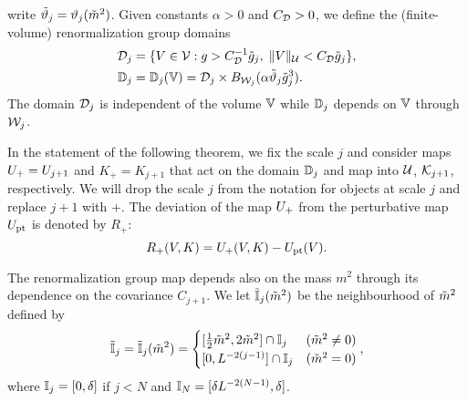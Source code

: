 
write $\tilde{\vartheta}_j = \vartheta_j(\tilde{m}^2)$.
Given constants $\alpha > 0$ and $C_{\mathcal{D}} > 0$, we define the (finite-volume)
renormalization group domains
\begin{align}
\label{e:DVdef}
\mathcal{D}_j
	&=
\{ V\in \mathcal{V} :
	g > C_{\mathcal{D}}^{-1} \tilde{g}_j, \; \|V\|_{\mathcal{U}} < C_{\mathcal{D}} \tilde{g}_j \}, \\
\label{e:domRG}
\mathbb{D}_j
	&= \mathbb{D}_j(\mathbb{V})
	= \mathcal{D}_j \times B_{\mathcal{W}_j}(\alpha \tilde{\vartheta}_j \tilde{g}_j^3).
\end{align}
The domain $\mathcal{D}_j$ is independent of the volume $\mathbb{V}$ while $\mathbb{D}_j$
depends on $\mathbb{V}$ through $\mathcal{W}_j$.

In the statement of the following theorem, we fix the scale $j$ and
consider maps $U_+ = U_{j+1}$ and $K_+ = K_{j+1}$ that act on the domain
$\mathbb{D}_j$ and map into $\mathcal{U}$, $\mathcal{K}_{j+1}$, respectively.
We will drop the scale $j$ from the notation for objects at scale $j$
and replace $j + 1$ with $+$.
The deviation of the map $U_+$ from the perturbative map $U_{\rm pt}$
is denoted by $R_+$:
\begin{equation}
\label{e:Rplusdef}
    R_+(V,K) = U_+(V,K) -U_{\rm pt}(V).
\end{equation}

The renormalization group map depends also on the mass $m^2$ through its
dependence on the covariance $C_{j+1}$.
We let $\tilde{\mathbb{I}}_j(\tilde{m}^2)$ be the neighbourhood of $\tilde{m}^2$ defined by
\begin{equation}
\lbeq{Itilint}
    \Igen_j = \Igen_j(\mgen^2) =
    \begin{cases}
    [\frac 12 \mgen^2, 2 \mgen^2] \cap \Iint_j & (\mgen^2 \neq 0)
    \\
    [0,L^{-2(j-1)}] \cap \Iint_j & (\mgen^2 =0)
    \end{cases},
\end{equation}
where $\mathbb{I}_j = [0, \delta]$ if $j < N$ and $\mathbb{I}_N = [\delta L^{-2 (N - 1)}, \delta]$.

